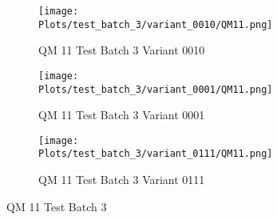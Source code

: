 \documentclass{DissertateFigs}
\begin{document}
\begin{figure}[t!]
\medskip

    \begin{subfigure}{0.47\textwidth}
    \texttt{[image: Plots/test\_batch\_3/variant\_0010/QM11.png]}
    \caption{QM 11 Test Batch 3 Variant 0010}
    \end{subfigure}
    \begin{subfigure}{0.47\textwidth}
    \texttt{[image: Plots/test\_batch\_3/variant\_0001/QM11.png]}
    \caption{QM 11 Test Batch 3 Variant 0001}
    \end{subfigure}

\medskip

    \begin{subfigure}{0.47\textwidth}
    \texttt{[image: Plots/test\_batch\_3/variant\_0111/QM11.png]}
    \caption{QM 11 Test Batch 3 Variant 0111}
    \end{subfigure}
\caption{QM 11 Test Batch 3}
    \end{figure}
\clearpage
\end{document}
